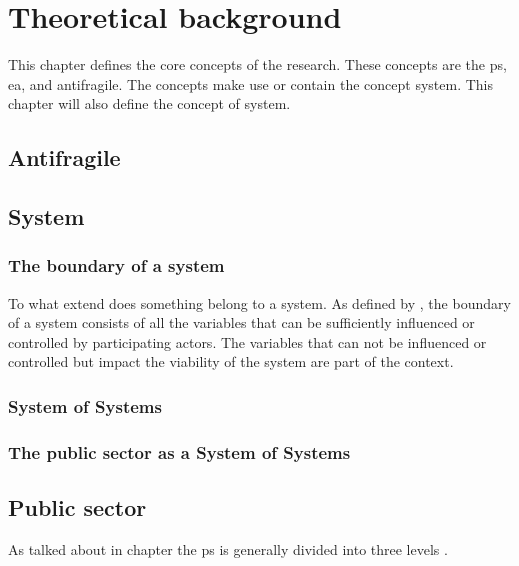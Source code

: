 \chapter{Theoretical background}
\label{ch:theoreticalbackground}
This chapter defines the core concepts of the research. These concepts are the \gls{ps}, \acrlong{ea}, and \gls{antifragile}. The concepts make use or contain the concept system. This chapter will also define the concept of system.

\section{Antifragile}
\label{sec:tbantifragile}




\section{System}
\label{sec:tbsystem}

\subsection{The boundary of a system}
To what extend does something belong to a system. As defined by \textcite[p. 182-183]{Gharajedaghi2011}, the boundary of a system consists of all the variables that can be sufficiently influenced or controlled by participating actors. The variables that can not be influenced or controlled but impact the viability of the system are part of the context.

\subsection{System of Systems}





\subsection{The public sector as a System of Systems}
\label{sub:tbpssystemofsystems}

\section{Public sector}
\label{sec:tbpublicsector}

As talked about in chapter  the \gls{ps} is generally divided into three levels \parencite{PrivacySense2016}.


